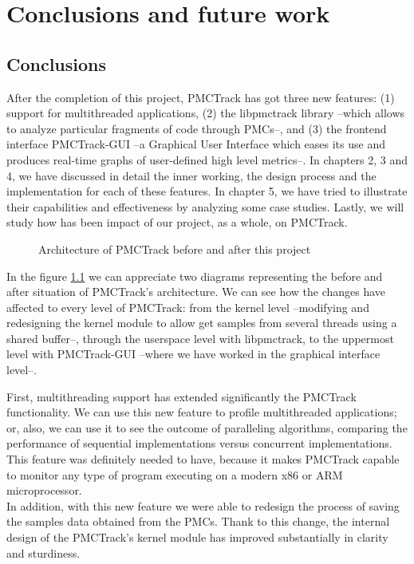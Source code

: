 \chapter{Conclusions and future work}


\section{Conclusions}

After the completion of this project, PMCTrack has got three new features: (1) support for multithreaded applications, (2) the libpmctrack library --which allows to analyze particular fragments of code through PMCs--, and (3) the frontend interface PMCTrack-GUI --a Graphical User Interface which eases its use and produces real-time graphs of user-defined high level metrics--. In chapters 2, 3 and 4, we have discussed in detail the inner working, the design process and the implementation for each of these features. In chapter 5, we have tried to illustrate their capabilities and effectiveness by analyzing some case studies. Lastly, we will study how has been impact of our project, as a whole, on PMCTrack.

\begin{figure}%
    \centering
    \qquad
\caption{Architecture of PMCTrack before and after this project}%
\label{fig:beforeandafter}%
\end{figure}

In the figure \ref{fig:beforeandafter} we can appreciate two diagrams representing the before and after situation of PMCTrack's architecture. We can see how the changes have affected to every level of PMCTrack: from the kernel level --modifying and redesigning the kernel module to allow get samples from several threads using a shared buffer--, through the userspace level with libpmctrack, to the uppermost level with PMCTrack-GUI --where we have worked in the graphical interface level--.

First, multithreading support has extended significantly the PMCTrack functionality. We can use this new feature to profile multithreaded applications; or, also, we can use it to see the outcome of paralleling algorithms, comparing the performance of sequential implementations versus concurrent implementations. This feature was definitely needed to have, because it makes PMCTrack capable to monitor any type of program executing on a modern x86 or ARM microprocessor.\\%
In addition, with this new feature we were able to redesign the process of saving the samples data obtained from the PMCs. Thank to this change, the internal design of the PMCTrack's kernel module has improved substantially in clarity and sturdiness.

